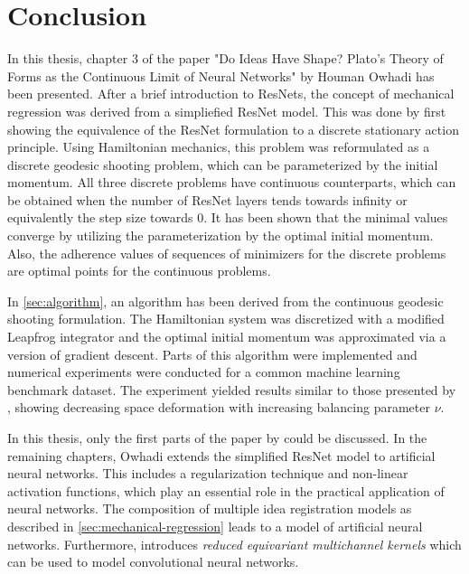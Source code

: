 \section{Conclusion}

In this thesis, chapter 3 of the paper "Do Ideas Have Shape? Plato's Theory of Forms as the Continuous Limit of Neural Networks" by Houman Owhadi has been presented.
After a brief introduction to ResNets, the concept of mechanical regression was derived from a simpliefied ResNet model.
This was done by first showing the equivalence of the ResNet formulation to a discrete stationary action principle.
Using Hamiltonian mechanics, this problem was reformulated as a discrete geodesic shooting problem, which can be parameterized by the initial momentum.
All three discrete problems have continuous counterparts, which can be obtained when the number of ResNet layers tends towards infinity or equivalently the step size towards $0$.
It has been shown that the minimal values converge by utilizing the parameterization by the optimal initial momentum.
Also, the adherence values of sequences of minimizers for the discrete problems are optimal points for the continuous problems.

In \cref{sec:algorithm}, an algorithm has been derived from the continuous geodesic shooting formulation.
The Hamiltonian system was discretized with a modified Leapfrog integrator and the optimal initial momentum was approximated via a version of gradient descent.
Parts of this algorithm were implemented and numerical experiments were conducted for a common machine learning benchmark dataset.
The experiment yielded results similar to those presented by \cite{owhadi20}, showing decreasing space deformation with increasing balancing parameter $\nu$.

In this thesis, only the first parts of the paper by \citet{owhadi20} could be discussed.
In the remaining chapters, Owhadi extends the simplified ResNet model to artificial neural networks.
This includes a regularization technique and non-linear activation functions, which play an essential role in the practical application of neural networks.
The composition of multiple idea registration models as described in \cref{sec:mechanical-regression} leads to a model of artificial neural networks.
Furthermore, \citet{owhadi20} introduces \emph{reduced equivariant multichannel kernels} which can be used to model convolutional neural networks.